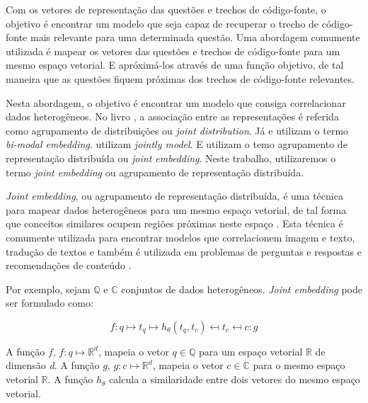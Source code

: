 Com os vetores de representação das questões e trechos de código-fonte, o objetivo é encontrar um modelo que seja capaz de recuperar o trecho de código-fonte mais relevante para uma determinada questão. Uma abordagem comumente utilizada é mapear os vetores das questões e trechos de código-fonte para um mesmo espaço vetorial. E apróximá-los através de uma função objetivo, de tal maneira que as questões fiquem próximas dos trechos de código-fonte relevantes. 

Nesta abordagem, o objetivo é encontrar um modelo que consiga correlacionar dados heterogêneos. No livro \cite{Goodfellow-et-al-2016}, a associação entre as representações é referida como agrupamento de distribuições ou \textit{joint distribution}. Já \cite{cambronero-deep-learning-code-search:2019} e \cite{Allamanis-bimodal-source-code-natural-language:2015} utilizam o termo \textit{bi-modal embedding}. \cite{Zhang:2019:deep-learning-recommender-survey} utilizam \textit{jointly model}. E \cite{Gu-deep-code-search:2018} utilizam o temo agrupamento de representação distribuída ou \textit{joint embedding}. Neste trabalho, utilizaremos o termo \textit{joint embedding} ou agrupamento de representação distribuída.


\textit{Joint embedding}, ou agrupamento de representação distribuída, é uma técnica para mapear dados heterogêneos para um mesmo espaço vetorial, de tal forma que conceitos similares ocupem regiões próximas neste espaço \citep{Gu-deep-code-search:2018}. Esta técnica é comumente utilizada para encontrar modelos que correlacionem imagem e texto, tradução de textos e também é utilizada em problemas de perguntas e respostas e recomendações de conteúdo \citep{lai-etal-2018-review, Zhang:2019:deep-learning-recommender-survey}.

Por exemplo, sejam $\mathbb{Q}$ e $\mathbb{C}$ conjuntos de dados heterogêneos. \textit{Joint embedding} pode ser formulado como:

\begin{equation}
        f: q \mapsto t_{q} \mapsto h_{\theta}(t_{q}, t_{c}) \mapsfrom t_{c} \mapsfrom c :g
\end{equation}

A função $f$, $f: q \mapsto \mathbb{R}^{d}$, mapeia o vetor  $q \in \mathbb{Q}$ para um espaço vetorial $\mathbb{R}$ de dimensão \emph{d}. A função $g$, $g: c \mapsto \mathbb{R}^{d}$, mapeia o vetor $c \in \mathbb{C}$ para o mesmo espaço vetorial $\mathbb{R}$. A função $h_{\theta}$ calcula a similaridade entre dois vetores do mesmo espaço vetorial.



